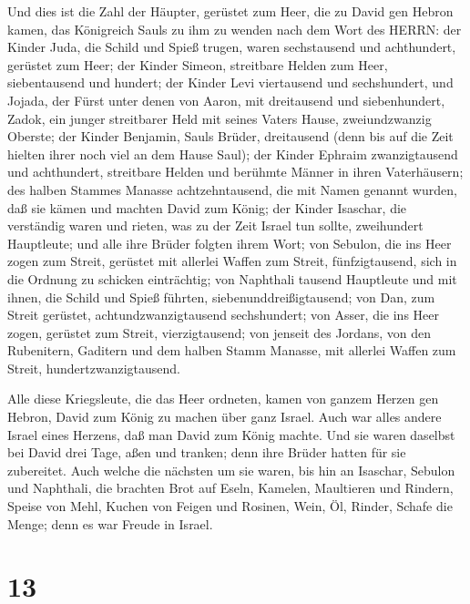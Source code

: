  Und dies ist die Zahl der Häupter, gerüstet zum Heer, die
zu David gen Hebron kamen, das Königreich Sauls zu ihm zu wenden nach
dem Wort des HERRN:  der Kinder Juda, die Schild und Spieß
trugen, waren sechstausend und achthundert, gerüstet zum Heer;
 der Kinder Simeon, streitbare Helden zum Heer,
siebentausend und hundert;  der Kinder Levi viertausend und
sechshundert,  und Jojada, der Fürst unter denen von Aaron,
mit dreitausend und siebenhundert,  Zadok, ein junger
streitbarer Held mit seines Vaters Hause, zweiundzwanzig Oberste;
 der Kinder Benjamin, Sauls Brüder, dreitausend (denn bis
auf die Zeit hielten ihrer noch viel an dem Hause Saul); 
der Kinder Ephraim zwanzigtausend und achthundert, streitbare Helden und
berühmte Männer in ihren Vaterhäusern;  des halben Stammes
Manasse achtzehntausend, die mit Namen genannt wurden, daß sie kämen und
machten David zum König;  der Kinder Isaschar, die
verständig waren und rieten, was zu der Zeit Israel tun sollte,
zweihundert Hauptleute; und alle ihre Brüder folgten ihrem Wort;
 von Sebulon, die ins Heer zogen zum Streit, gerüstet mit
allerlei Waffen zum Streit, fünfzigtausend, sich in die Ordnung zu
schicken einträchtig;  von Naphthali tausend Hauptleute und
mit ihnen, die Schild und Spieß führten, siebenunddreißigtausend;
 von Dan, zum Streit gerüstet, achtundzwanzigtausend
sechshundert;  von Asser, die ins Heer zogen, gerüstet zum
Streit, vierzigtausend;  von jenseit des Jordans, von den
Rubenitern, Gaditern und dem halben Stamm Manasse, mit allerlei Waffen
zum Streit, hundertzwanzigtausend.

 Alle diese Kriegsleute, die das Heer ordneten, kamen von
ganzem Herzen gen Hebron, David zum König zu machen über ganz Israel.
Auch war alles andere Israel eines Herzens, daß man David zum König
machte.  Und sie waren daselbst bei David drei Tage, aßen
und tranken; denn ihre Brüder hatten für sie zubereitet. 
Auch welche die nächsten um sie waren, bis hin an Isaschar, Sebulon und
Naphthali, die brachten Brot auf Eseln, Kamelen, Maultieren und Rindern,
Speise von Mehl, Kuchen von Feigen und Rosinen, Wein, Öl, Rinder, Schafe
die Menge; denn es war Freude in Israel.

\hypertarget{section-12}{%
\section{13}\label{section-12}}

